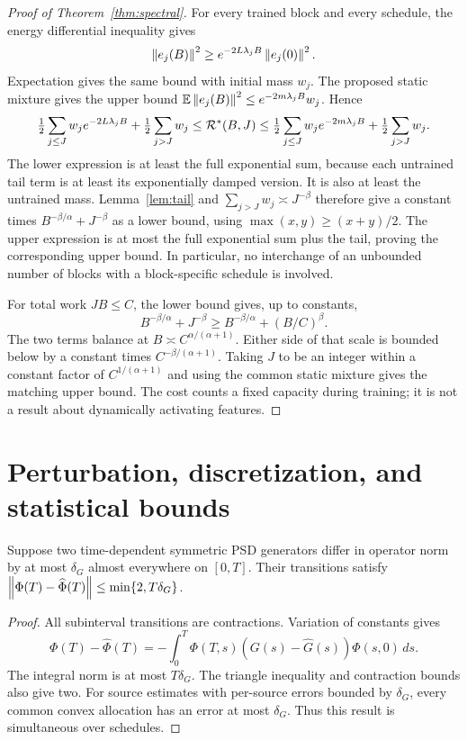 \begin{proof}[Proof of Theorem~\ref{thm:spectral}]
For every trained block and every schedule, the energy differential inequality gives
\[
 \left\lVert e_j(B)\right\rVert^2\ge e^{-2L\lambda_jB}\left\lVert e_j(0)\right\rVert^2.
\]
Expectation gives the same bound with initial mass $w_j$. The proposed static mixture gives the upper bound $\mathbb E\left\lVert e_j(B)\right\rVert^2\le e^{-2m\lambda_jB}w_j$. Hence
\[
 \tfrac12\sum_{j\le J}w_je^{-2L\lambda_jB}+\tfrac12\sum_{j>J}w_j
 \le\mathcal R^*(B,J)
 \le\tfrac12\sum_{j\le J}w_je^{-2m\lambda_jB}+\tfrac12\sum_{j>J}w_j.
\]
The lower expression is at least the full exponential sum, because each untrained tail term is at least its exponentially damped version. It is also at least the untrained mass. Lemma~\ref{lem:tail} and $\sum_{j>J}w_j\asymp J^{-\beta}$ therefore give a constant times $B^{-\beta/\alpha}+J^{-\beta}$ as a lower bound, using $\max(x,y)\ge(x+y)/2$. The upper expression is at most the full exponential sum plus the tail, proving the corresponding upper bound. In particular, no interchange of an unbounded number of blocks with a block-specific schedule is involved.

For total work $JB\le C$, the lower bound gives, up to constants,
\[
 B^{-\beta/\alpha}+J^{-\beta}
 \ge B^{-\beta/\alpha}+(B/C)^\beta.
\]
The two terms balance at $B\asymp C^{\alpha/(\alpha+1)}$. Either side of that scale is bounded below by a constant times $C^{-\beta/(\alpha+1)}$. Taking $J$ to be an integer within a constant factor of $C^{1/(\alpha+1)}$ and using the common static mixture gives the matching upper bound. The cost counts a fixed capacity during training; it is not a result about dynamically activating features.
\end{proof}

\section{Perturbation, discretization, and statistical bounds}\label{app:certificate}
\begin{lemma}\label{lem:duhamel}
Suppose two time-dependent symmetric PSD generators differ in operator norm by at most $\delta_G$ almost everywhere on $[0,T]$. Their transitions satisfy
$\left\lVert\Phi(T)-\widehat\Phi(T)\right\rVert\le\min\{2,T\delta_G\}$.
\end{lemma}
\begin{proof}
All subinterval transitions are contractions. Variation of constants gives
\[
 \Phi(T)-\widehat\Phi(T)=
 -\int_0^T\Phi(T,s)(G(s)-\widehat G(s))\widehat\Phi(s,0)\,ds.
\]
The integral norm is at most $T\delta_G$. The triangle inequality and contraction bounds also give two. For source estimates with per-source errors bounded by $\delta_G$, every common convex allocation has an error at most $\delta_G$. Thus this result is simultaneous over schedules.
\end{proof}

